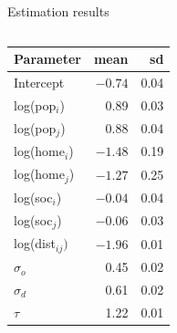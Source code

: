 \documentclass{beamer}
\begin{document}
\begin{frame}{Estimation results}
		\begin{columns}
		\begin{column}{0.5\textwidth}
			\begin{center}
				\begin{small}
			  \begin{tabular}{lrr}
				\toprule
				Parameter & mean & sd \\ 
				\midrule
				Intercept      & $-0.74$ & 0.04 \\ 
				log(pop$_i$)   & 0.89 & 0.03  \\ 
				log(pop$_j$)   & 0.88 & 0.04  \\ 
				log(home$_i$)  & $-1.48$ & 0.19 \\ 
				log(home$_j$)  & $-1.27$ & 0.25  \\ 
				log(soc$_i$)   & $-0.04$ & 0.04  \\
				log(soc$_j$)   & $-0.06$ & 0.03 \\ 
				log(dist$_{ij})$ & $-1.96$ & 0.01  \\ 
				$\sigma_o$    & 0.45 & 0.02  \\ 
				$\sigma_d$    & 0.61 & 0.02  \\ 
				$\tau$        & 1.22 & 0.01  \\ 
				\bottomrule
			\end{tabular}
		\end{small}
		\end{center}
		\end{column}
		\begin{column}{0.5\textwidth} 


\end{column}
\end{columns}
\end{frame}
\end{document}
